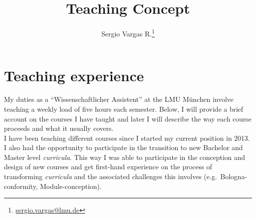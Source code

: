 \documentclass[a4paper,11pt]{article}
\makeatletter
\renewcommand{\maketitle}{\bgroup\setlength{\parindent}{0pt}
\begin{flushleft}
  \thispagestyle{plain}
  \textbf{\@title}

  \@author
\end{flushleft}\egroup
}
\renewenvironment{abstract}
 {\small
  \begin{flushleft}
  \textbf{\abstractname}\vspace{-0.40em}\vspace{0pt}
  \end{flushleft}
  \list{}{
    \setlength{\leftmargin}{0cm}%
    \setlength{\rightmargin}{\leftmargin}%
  }%
  \item\relax}
 {\endlist}
\makeatother
\begin{document}
\title{\Large Teaching Concept\newline}

\author[1]{Sergio Vargas R.\footnote[2]{\href{sergio.vargas@lmu.de}{sergio.vargas@lmu.de}}}


\date{}

\maketitle


\section*{Teaching experience}

My duties as a ``Wissenschaftlicher Assistent'' at the LMU M\"unchen involve teaching a weekly load of five hours each semester. Below, I will provide a brief account on the courses I have taught and later I will describe the way each course proceeds and what it usually covers.\\

I have been teaching different courses since I started my current position in 2013. I also had the opportunity to participate in the transition to new Bachelor and Master level \emph{curricula}. This way I was able to participate in the conception and design of new courses and get first-hand experience on the process of transforming \emph{curricula} and the associated challenges this involves (e.g.~Bologna-conformity, Module-conception).\\
\end{document}
